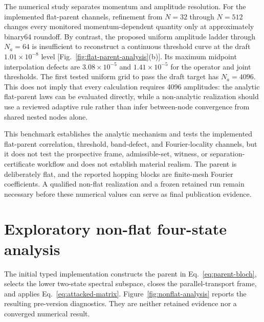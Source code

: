 \documentclass[11pt]{article}
\begin{document}
The numerical study separates momentum and amplitude resolution. For the implemented
flat-parent channels, refinement from $N=32$ through $N=512$ changes every monitored
momentum-dependent quantity only at approximately binary64 roundoff. By contrast, the
proposed uniform amplitude ladder
through $N_a=64$ is insufficient to reconstruct a continuous threshold curve at the
draft $1.01\times10^{-8}$ level [Fig.~\ref{fig:flat-parent-analysis}(b)]. Its maximum
midpoint interpolation defects are $3.08\times10^{-5}$ and $1.41\times10^{-5}$ for the
operator and joint thresholds. The first tested uniform grid to pass the draft target
has $N_a=4096$. This does not imply that every calculation requires 4096 amplitudes: the
analytic flat-parent laws can be evaluated directly, while a non-analytic realization
should use a reviewed adaptive rule rather than infer between-node convergence from
shared nested nodes alone.

This benchmark establishes the analytic mechanism and tests the implemented flat-parent
correlation, threshold, band-defect, and Fourier-locality channels, but it does not test
the prospective frame, admissible-set, witness, or separation-certificate workflow and
does not establish material realism. The parent is deliberately flat, and the reported
hopping blocks are finite-mesh Fourier coefficients. A qualified non-flat realization
and a frozen retained run remain necessary before these numerical values can serve as
final publication evidence.

\section{Exploratory non-flat four-state analysis}
\label{sec:nonflat-exploratory}

The initial typed implementation constructs the parent in
Eq.~\eqref{eq:parent-bloch}, selects the lower two-state spectral subspace, closes the
parallel-transport frame, and applies Eq.~\eqref{eq:attacked-matrix}. Figure~\ref{fig:nonflat-analysis}
reports the resulting pre-version diagnostics. They are neither retained evidence nor a
converged numerical result.
\end{document}
